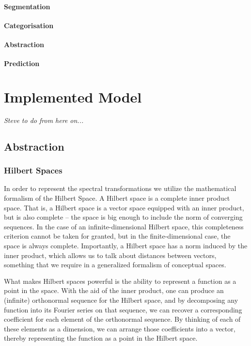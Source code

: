 \documentclass[runningheads]{llncs}
\begin{document}
\paragraph{Segmentation}
\paragraph{Categorisation}
\paragraph{Abstraction}
\paragraph{Prediction}


\section{Implemented Model}
{\it Steve to do from here on...}


\subsection{Abstraction}

\subsubsection{Hilbert Spaces}
In order to represent the spectral transformations we utilize the mathematical formalism of the Hilbert Space.  A Hilbert space is a complete inner product space.  That is, a Hilbert space is a vector space equipped with an inner product, but is also complete -- the space is big enough to include the norm of converging sequences.  In the case of an infinite-dimensional Hilbert space, this completeness criterion cannot be taken for granted, but in the finite-dimensional case, the space is always complete.  Importantly, a Hilbert space has a norm induced by the inner product, which allows us to talk about distances between vectors, something that we require in a generalized formalism of conceptual spaces.

What makes Hilbert spaces powerful is the ability to represent a function as a point in the space.  With the aid of the inner product, one can produce an (infinite) orthonormal sequence for the Hilbert space, and by decomposing any function into its Fourier series on that sequence, we can recover a corresponding coefficient for each element of the orthonormal sequence.  By thinking of each of these elements as a dimension, we can arrange those coefficients into a vector, thereby representing the function as a point in the Hilbert space.
\end{document}
